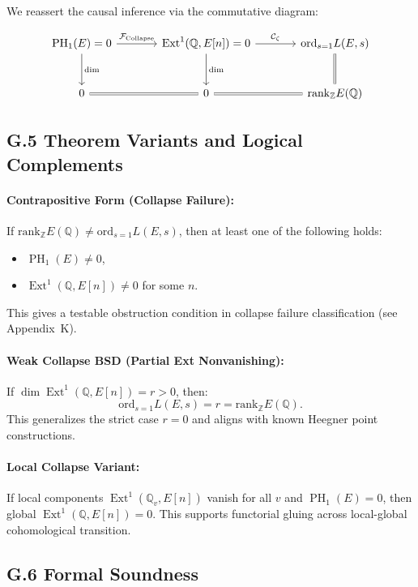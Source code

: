 \documentclass[11pt]{article}
\DeclareMathOperator{\Ext}{Ext}
\DeclareMathOperator{\PH}{PH}
\newcommand{\QQ}{\mathbb{Q}}
\newcommand{\ZZ}{\mathbb{Z}}
\begin{document}
We reassert the causal inference via the commutative diagram:

\[
\begin{tikzcd}[row sep=large, column sep=large]
\PH_1(E) = 0 \arrow[r, "\mathcal{F}_{\mathrm{Collapse}}"] \arrow[d, "\dim"]
& \Ext^1(\QQ,E[n]) = 0 \arrow[d, "\dim"] \arrow[r, "\mathcal{C}_{\zeta}"]
& \mathrm{ord}_{s=1} L(E,s) \arrow[d, equal] \\
0 \arrow[r, equal] & 0 \arrow[r, equal] & \mathrm{rank}_{\ZZ} E(\QQ)
\end{tikzcd}
\]

\subsection*{G.5 Theorem Variants and Logical Complements}

\paragraph{Contrapositive Form (Collapse Failure):}
If $\mathrm{rank}_{\ZZ} E(\QQ) \neq \mathrm{ord}_{s=1} L(E,s)$, then at least one of the following holds:
\begin{itemize}
  \item $\PH_1(E) \neq 0$,
  \item $\Ext^1(\QQ, E[n]) \neq 0$ for some $n$.
\end{itemize}
This gives a testable obstruction condition in collapse failure classification (see Appendix~K).

\paragraph{Weak Collapse BSD (Partial Ext Nonvanishing):}
If $\dim \Ext^1(\QQ, E[n]) = r > 0$, then:
\[
\mathrm{ord}_{s=1} L(E,s) = r = \mathrm{rank}_{\ZZ} E(\QQ).
\]
This generalizes the strict case $r = 0$ and aligns with known Heegner point constructions.

\paragraph{Local Collapse Variant:}
If local components $\Ext^1(\QQ_v, E[n])$ vanish for all $v$ and $\PH_1(E) = 0$, then global $\Ext^1(\QQ,E[n]) = 0$.
This supports functorial gluing across local-global cohomological transition.

\subsection*{G.6 Formal Soundness}
\end{document}
